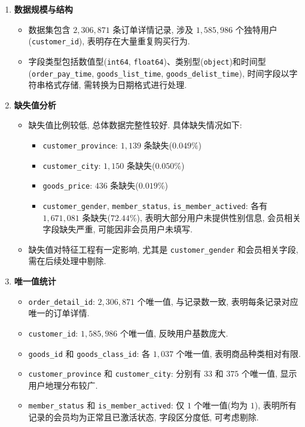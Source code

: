 \documentclass[11pt, a4paper]{article}
\begin{document}
\begin{enumerate}
    \item \textbf{数据规模与结构}
    \begin{itemize}
        \item 数据集包含 $2,306,871$ 条订单详情记录, 涉及 $1,585,986$ 个独特用户(\texttt{customer\_id}), 表明存在大量重复购买行为.
        \item 字段类型包括数值型(\texttt{int64}, \texttt{float64})、类别型(\texttt{object})和时间型(\texttt{order\_pay\_time}, \texttt{goods\_list\_time}, \texttt{goods\_delist\_time}), 时间字段以字符串格式存储, 需转换为日期格式进行处理.
    \end{itemize}

    \item \textbf{缺失值分析}
    \begin{itemize}
        \item 缺失值比例较低, 总体数据完整性较好. 具体缺失情况如下:
        \begin{itemize}
            \item \texttt{customer\_province}: $1,139$ 条缺失($0.049\%$)
            \item \texttt{customer\_city}: $1,150$ 条缺失($0.050\%$)
            \item \texttt{goods\_price}: $436$ 条缺失($0.019\%$)
            \item \texttt{customer\_gender}, \texttt{member\_status}, \texttt{is\_member\_actived}: 各有 $1,671,081$ 条缺失($72.44\%$), 表明大部分用户未提供性别信息, 会员相关字段缺失严重, 可能因非会员用户未填写.
        \end{itemize}
        \item 缺失值对特征工程有一定影响, 尤其是 \texttt{customer\_gender} 和会员相关字段, 需在后续处理中剔除.
    \end{itemize}

    \item \textbf{唯一值统计}
    \begin{itemize}
        \item \texttt{order\_detail\_id}: $2,306,871$ 个唯一值, 与记录数一致, 表明每条记录对应唯一的订单详情.
        \item \texttt{customer\_id}: $1,585,986$ 个唯一值, 反映用户基数庞大.
        \item \texttt{goods\_id} 和 \texttt{goods\_class\_id}: 各 $1,037$ 个唯一值, 表明商品种类相对有限.
        \item \texttt{customer\_province} 和 \texttt{customer\_city}: 分别有 $33$ 和 $375$ 个唯一值, 显示用户地理分布较广.
        \item \texttt{member\_status} 和 \texttt{is\_member\_actived}: 仅 $1$ 个唯一值(均为 $1$), 表明所有记录的会员均为正常且已激活状态, 字段区分度低, 可考虑剔除.
    \end{itemize}


\end{enumerate}
\end{document}
